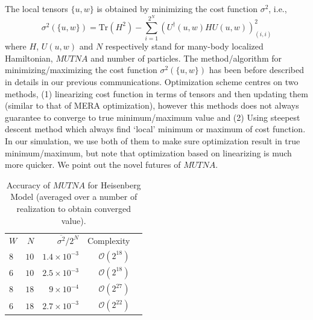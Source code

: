 \documentclass[aps,prb,twocolumn,groupedaddress,notitlepage,showpacs,floatfix,superscriptaddress]{revtex4-1}
\begin{document}
The local tensors $\{u, w\}$ is obtained by minimizing the cost function $\sigma^{2}$, i.e.,
\begin{equation*}
\sigma^{2}(\{u, w\})=\mathrm{Tr}(H^{2})-\sum_{i=1}^{2^{N}} (U^{\dagger}(u, w)HU(u, w))^{2}_{(i,i)}
\end{equation*}
where $H$, $U(u,w)$ and $N$ respectively stand for many-body localized Hamiltonian, $MUTNA$ and number of particles. The method/algorithm for minimizing/maximizing the cost function $\sigma^{2}(\{u, w\})$ has been before described in details in our previous communications. Optimization scheme  centres on two methods, (1) linearizing cost function in terms of tensors and then updating them (similar to that of MERA optimization), however this methods does not always guarantee to converge to true minimum/maximum value and (2) Using steepest descent method which always find `local' minimum or maximum of cost function. In our simulation, we use both of them to make sure optimization result in true minimum/maximum, but note that optimization based on linearizing is much more quicker. We point out the novel futures of $MUTNA$.
\begin{table}[tp]
\caption{
 Accuracy of $MUTNA$ for Heisenberg Model (averaged over a number of realization to obtain converged value).
}
\begin{ruledtabular}
\begin{tabular}{lrrrr}
$W$&$N$& $\overline{\sigma^{2}}/2^{N}$ &
Complexity\\
\colrule
$8$ & $10$ & $1.4\times10^{-3}$ & $\mathcal{O}(2^{18})$   \\
$6$ & $10$ & $2.5\times10^{-3}$ & $\mathcal{O}(2^{18})$  \\
$8$ & $18$ & $9\times10^{-4}$ & $\mathcal{O}(2^{27})$ \\
$6$ & $18$ & $2.7\times10^{-3}$ & $\mathcal{O}(2^{22})$ \\
\end{tabular}
\end{ruledtabular}
\label{table-1}
\end{table}
\end{document}
